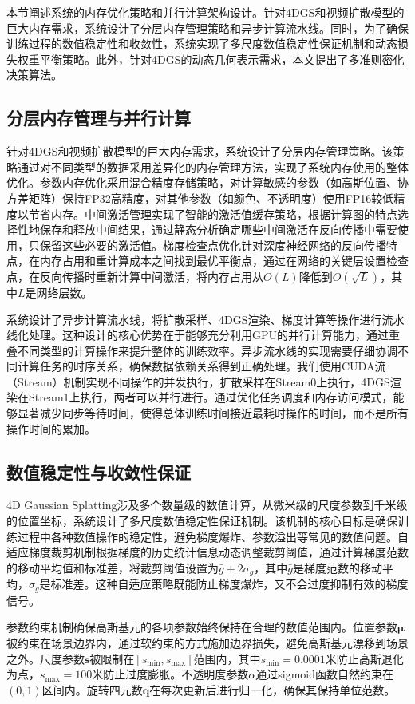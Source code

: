 本节阐述系统的内存优化策略和并行计算架构设计。针对4DGS和视频扩散模型的巨大内存需求，系统设计了分层内存管理策略和异步计算流水线。同时，为了确保训练过程的数值稳定性和收敛性，系统实现了多尺度数值稳定性保证机制和动态损失权重平衡策略。此外，针对4DGS的动态几何表示需求，本文提出了多准则密化决策算法。

\subsection{分层内存管理与并行计算}

针对4DGS和视频扩散模型的巨大内存需求，系统设计了分层内存管理策略。该策略通过对不同类型的数据采用差异化的内存管理方法，实现了系统内存使用的整体优化。参数内存优化采用混合精度存储策略，对计算敏感的参数（如高斯位置、协方差矩阵）保持FP32高精度，对其他参数（如颜色、不透明度）使用FP16较低精度以节省内存。中间激活管理实现了智能的激活值缓存策略，根据计算图的特点选择性地保存和释放中间结果，通过静态分析确定哪些中间激活在反向传播中需要使用，只保留这些必要的激活值。梯度检查点优化针对深度神经网络的反向传播特点，在内存占用和重计算成本之间找到最优平衡点，通过在网络的关键层设置检查点，在反向传播时重新计算中间激活，将内存占用从$O(L)$降低到$O(\sqrt{L})$，其中$L$是网络层数。

系统设计了异步计算流水线，将扩散采样、4DGS渲染、梯度计算等操作进行流水线化处理。这种设计的核心优势在于能够充分利用GPU的并行计算能力，通过重叠不同类型的计算操作来提升整体的训练效率。异步流水线的实现需要仔细协调不同计算任务的时序关系，确保数据依赖关系得到正确处理。我们使用CUDA流（Stream）机制实现不同操作的并发执行，扩散采样在Stream0上执行，4DGS渲染在Stream1上执行，两者可以并行进行。通过优化任务调度和内存访问模式，能够显著减少同步等待时间，使得总体训练时间接近最耗时操作的时间，而不是所有操作时间的累加。

\subsection{数值稳定性与收敛性保证}

4D Gaussian Splatting涉及多个数量级的数值计算，从微米级的尺度参数到千米级的位置坐标，系统设计了多尺度数值稳定性保证机制。该机制的核心目标是确保训练过程中各种数值操作的稳定性，避免梯度爆炸、参数溢出等常见的数值问题。自适应梯度裁剪机制根据梯度的历史统计信息动态调整裁剪阈值，通过计算梯度范数的移动平均值和标准差，将裁剪阈值设置为$\bar{g} + 2\sigma_g$，其中$\bar{g}$是梯度范数的移动平均，$\sigma_g$是标准差。这种自适应策略既能防止梯度爆炸，又不会过度抑制有效的梯度信号。

参数约束机制确保高斯基元的各项参数始终保持在合理的数值范围内。位置参数$\boldsymbol{\mu}$被约束在场景边界内，通过软约束的方式施加边界损失，避免高斯基元漂移到场景之外。尺度参数$\mathbf{s}$被限制在$[s_{\min}, s_{\max}]$范围内，其中$s_{\min} = 0.0001$米防止高斯退化为点，$s_{\max} = 100$米防止过度膨胀。不透明度参数$\alpha$通过sigmoid函数自然约束在$(0, 1)$区间内。旋转四元数$\mathbf{q}$在每次更新后进行归一化，确保其保持单位范数。

